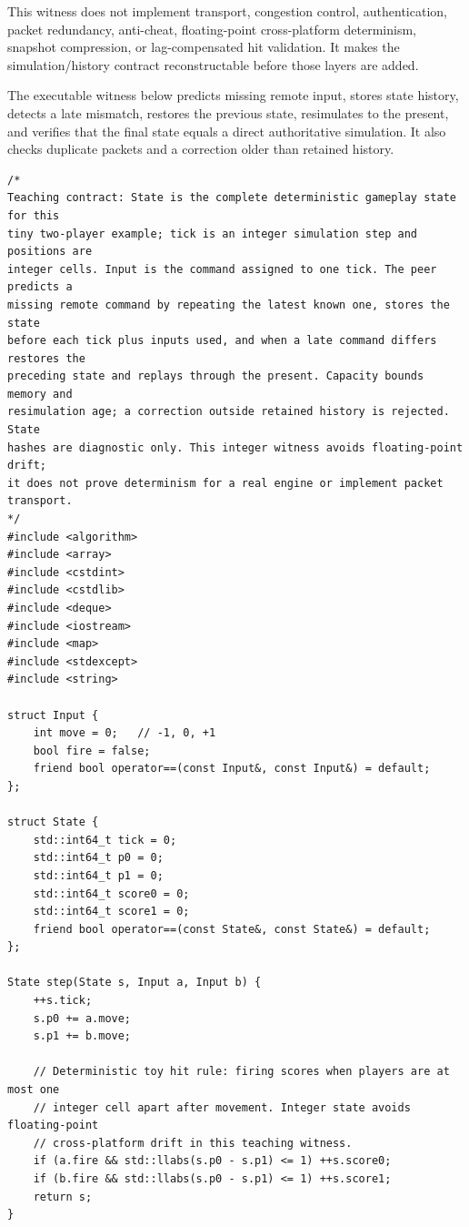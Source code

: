 This witness does not implement transport, congestion control, authentication, packet redundancy, anti-cheat, floating-point cross-platform determinism, snapshot compression, or lag-compensated hit validation. It makes the simulation/history contract reconstructable before those layers are added.

The executable witness below predicts missing remote input, stores state history, detects a late mismatch, restores the previous state, resimulates to the present, and verifies that the final state equals a direct authoritative simulation. It also checks duplicate packets and a correction older than retained history.

\begin{verbatim}
/*
Teaching contract: State is the complete deterministic gameplay state for this
tiny two-player example; tick is an integer simulation step and positions are
integer cells. Input is the command assigned to one tick. The peer predicts a
missing remote command by repeating the latest known one, stores the state
before each tick plus inputs used, and when a late command differs restores the
preceding state and replays through the present. Capacity bounds memory and
resimulation age; a correction outside retained history is rejected. State
hashes are diagnostic only. This integer witness avoids floating-point drift;
it does not prove determinism for a real engine or implement packet transport.
*/
#include <algorithm>
#include <array>
#include <cstdint>
#include <cstdlib>
#include <deque>
#include <iostream>
#include <map>
#include <stdexcept>
#include <string>

struct Input {
    int move = 0;   // -1, 0, +1
    bool fire = false;
    friend bool operator==(const Input&, const Input&) = default;
};

struct State {
    std::int64_t tick = 0;
    std::int64_t p0 = 0;
    std::int64_t p1 = 0;
    std::int64_t score0 = 0;
    std::int64_t score1 = 0;
    friend bool operator==(const State&, const State&) = default;
};

State step(State s, Input a, Input b) {
    ++s.tick;
    s.p0 += a.move;
    s.p1 += b.move;

    // Deterministic toy hit rule: firing scores when players are at most one
    // integer cell apart after movement. Integer state avoids floating-point
    // cross-platform drift in this teaching witness.
    if (a.fire && std::llabs(s.p0 - s.p1) <= 1) ++s.score0;
    if (b.fire && std::llabs(s.p0 - s.p1) <= 1) ++s.score1;
    return s;
}


\end{verbatim}
